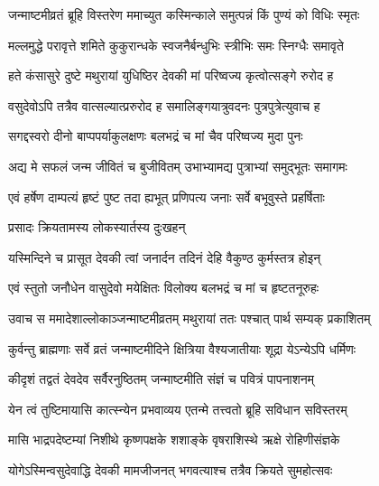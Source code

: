 

\twolineshloka
{जन्माष्टमीव्रतं ब्रूहि विस्तरेण ममाच्युत}
{कस्मिन्काले समुत्पन्नं किं पुण्यं को विधिः स्मृतः}%

\twolineshloka
{मल्लमुद्धे परावृत्ते शमिते कुकुरान्धके}
{स्वजनैर्बन्धुभिः स्त्रीभिः समः स्निग्धैः समावृते}%

\twolineshloka
{हते कंसासुरे दुष्टे मथुरायां युधिष्ठिर}
{देवकी मां परिष्वज्य कृत्वोत्सङ्गे रुरोद ह}%

\twolineshloka
{वसुदेवोऽपि तत्रैव वात्सल्यात्प्ररुरोद ह}
{समालिङ्गयात्रुवदनः पुत्रपुत्रेत्युवाच ह}%

\twolineshloka
{सगद्दस्वरो दीनो बाप्पपर्याकुलक्षणः}
{बलभद्रं च मां चैव परिष्वज्य मुदा पुनः}%

\twolineshloka
{अद्य मे सफलं जन्म जीवितं च बुजीवितम्}
{उभाभ्यामद्य पुत्राभ्यां समुद्भूतः समागमः}%

\twolineshloka
{एवं हर्षेण दाम्पत्यं हृष्टं पुष्ट तदा ह्यभूत्}
{प्रणिपत्य जनाः सर्वे बभूवुस्ते प्रहर्षिताः}%

\onelineshloka
{प्रसादः क्रियतामस्य लोकस्यार्तस्य दुःखहन्}%

\twolineshloka
{यस्मिन्दिने च प्रासूत देवकी त्वां जनार्दन}
{तदिनं देहि वैकुण्ठ कुर्मस्तत्र होइन्}%

\twolineshloka
{एवं स्तुतो जनौधेन वासुदेवो मयेक्षितः}
{विलोक्य बलभद्रं च मां च हृष्टतनूरुहः}%

\twolineshloka
{उवाच स ममादेशाल्लोकाञ्जन्माष्टमीव्रतम्}
{मथुरायां ततः पश्चात् पार्थ सम्यक् प्रकाशितम्}%

\twolineshloka
{कुर्वन्तु ब्राह्मणाः सर्वे व्रतं जन्माष्टमीदिने}
{क्षित्रिया वैश्यजातीयाः शूद्रा येऽन्येऽपि धर्मिणः}%

\twolineshloka
{कीदृशं तद्वतं देवदेव सर्वैरनुष्ठितम्}
{जन्माष्टमीति संज्ञं च पवित्रं पापनाशनम्}%

\twolineshloka
{येन त्वं तुष्टिमायासि कात्स्न्येन प्रभवाव्यय}
{एतन्मे तत्त्वतो ब्रूहि सविधान सविस्तरम्}%

\twolineshloka
{मासि भाद्रपदेष्टम्यां निशीथे कृष्णपक्षके}
{शशाङ्के वृषराशिस्थे ऋक्षे रोहिणीसंज्ञके}%

\twolineshloka
{योगेऽस्मिन्वसुदेवाद्धि देवकी मामजीजनत्}
{भगवत्याश्च तत्रैव क्रियते सुमहोत्सवः}%

